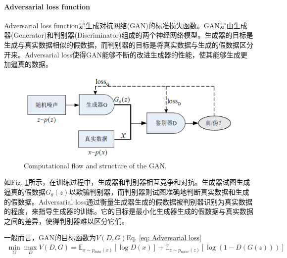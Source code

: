 \documentclass[letterpaper,12pt]{article}
\begin{document}
	\paragraph{Adversarial loss function}
	
	Adversarial loss function是生成对抗网络(GAN)的标准损失函数。GAN是由生成器(Generator)和判别器(Discriminator)组成的两个神经网络模型。生成器的目标是生成与真实数据相似的假数据，而判别器的目标是将真实数据与生成的假数据区分开来。Adversarial loss使得GAN能够不断的改进生成器的性能，使其能够生成更加逼真的数据。
	
	\begin{figure}[htbp] 
		\centering 
		\includegraphics[width=0.8\columnwidth]{GAN_architecture}
		\captionsetup{font=scriptsize}
		\caption{
			\label{fig: GAN_architecture} %
			Computational flow and structure of the GAN.
		}
	\end{figure}
	
	如Fig. \ref{fig: GAN_architecture}所示，在训练过程中，生成器和判别器相互竞争和对抗。生成器试图生成逼真的假数据$G_\theta{\left( z \right)}$以欺骗判别器，而判别器则试图准确地判断真实数据和生成的假数据。Adversarial loss通过衡量生成器生成的假数据被判别器识别为真实数据的程度，来指导生成器的训练。它的目标是最小化生成器生成的假数据与真实数据之间的差异，使得判别器难以区分它们。
	
	一般而言，GAN的目标函数为$V(D, G)$Eq. \ref{eq: Adversarial loss}
	\begin{equation}
		\begin{aligned}
			\min_G \max_D V\left( D, G \right) = \mathbb{E}_{x \sim p_{data}(x)}\left[ \log D(x) \right] + \mathbb{E}_{z \sim p_{noise}(z)}\left[ \log \left(1- D(G(z))\right) \right]
		\end{aligned}
		\label{eq: Adversarial loss_another}
	\end{equation}
	
\end{document}
